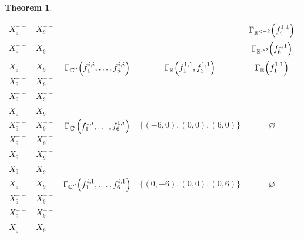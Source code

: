 \documentclass[noend]{amsproc}
\newtheorem{theorem}{Theorem}
\theoremstyle{definition}
\let\originalleft\left
\let\originalright\right
\renewcommand{\left}{\mathopen{}\mathclose\bgroup\originalleft}
\renewcommand{\right}{\aftergroup\egroup\originalright}
\DeclareMathOperator{\R}{\mathbb{R}}
\DeclareMathOperator{\C}{\mathbb{C}}
\begin{document}
\begin{theorem}
\begin{table}[htbp]
\begin{tabular}{|c|c||c|c|c|}
$X_9^{++}$ & $X_9^{--}$ &&&
$\Gamma_{\R^{<-2}}\left(f_4^{1,1}\right)$\specialvrule
\\ \cline{1-2}\cline{5-5}

$X_9^{--}$ & $X_9^{++}$ &&&
$\Gamma_{\R^{>2}}\left(f_6^{1,1}\right)$\specialvrule
\\ \hline


$X_9^{+-}$ & $X_9^{+-}$ &
\multirow{4}{*}{$\Gamma_{\C''}\left(f_1^{i,i}, \ldots, f_6^{i,i}\right)$} &
\multirow{4}{*}{$\Gamma_{\R}\left(f_1^{1,1}, f_2^{1,1}\right)$} &
\multirow{4}{*}{$\Gamma_{\R}\left(f_1^{1,1}\right)$} \\ \cline{1-2}

$X_9^{-+}$ & $X_9^{-+}$ &&& \\ \cline{1-2}

$X_9^{+-}$ & $X_9^{-+}$ &&& \\ \cline{1-2}

$X_9^{-+}$ & $X_9^{+-}$ &&& \\ \hline


$X_9^{++}$ & $X_9^{+-}$ &
\multirow{4}{*}{$\Gamma_{\C'}\left(f_1^{1,i}, \ldots, f_6^{1,i}\right)$} &
\multirow{4}{*}{$\{(-6,0), (0,0), (6,0)\}$} &
\multirow{4}{*}{$\varnothing$} \\ \cline{1-2}

$X_9^{++}$ & $X_9^{-+}$ &&& \\ \cline{1-2}

$X_9^{--}$ & $X_9^{+-}$ &&& \\ \cline{1-2}

$X_9^{--}$ & $X_9^{-+}$ &&& \\ \hline


$X_9^{+-}$ & $X_9^{++}$ &
\multirow{4}{*}{$\Gamma_{\C''}\left(f_1^{i,1}, \ldots, f_6^{i,1}\right)$} &
\multirow{4}{*}{$\{(0,-6), (0,0), (0,6)\}$} &
\multirow{4}{*}{$\varnothing$} \\ \cline{1-2}

$X_9^{-+}$ & $X_9^{++}$ &&& \\ \cline{1-2}

$X_9^{+-}$ & $X_9^{--}$ &&& \\ \cline{1-2}

$X_9^{-+}$ & $X_9^{--}$ &&& \\ \hline
\end{tabular}
\end{table}

\end{theorem}
\end{document}
